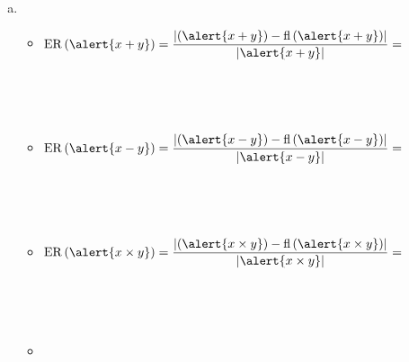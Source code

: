 \begin{frame}
\begin{solution}
		\begin{enumerate}[d)]
			\item

			      \begin{itemize}
				      \item

				            \begin{math}
					            \operatorname{ER}\left(\alert{x+y}\right)=
					            \dfrac{
						            \left|
						            \left(\alert{x+y}\right)-
						            \operatorname{fl}\left(\alert{x+y}\right)
						            \right|
					            }{
						            \left|
						            \alert{x+y}
						            \right|
					            }=
				            \end{math}

				            \

				            \

				      \item

				            \begin{math}
					            \operatorname{ER}\left(\alert{x-y}\right)=
					            \dfrac{
						            \left|
						            \left(\alert{x-y}\right)-
						            \operatorname{fl}\left(\alert{x-y}\right)
						            \right|
					            }{
						            \left|
						            \alert{x-y}
						            \right|
					            }=
				            \end{math}

				            \

				            \

				      \item

				            \begin{math}
					            \operatorname{ER}
					            \left(\alert{x\times y}\right)=
					            \dfrac{
						            \left|
						            \left(\alert{x\times y}\right)-
						            \operatorname{fl}
						            \left(\alert{x\times y}\right)
						            \right|
					            }{
						            \left|
						            \alert{x\times y}
						            \right|
					            }=
				            \end{math}

				            \

				            \

				      \item


\end{itemize}
\end{enumerate}
\end{solution}
\end{frame}
